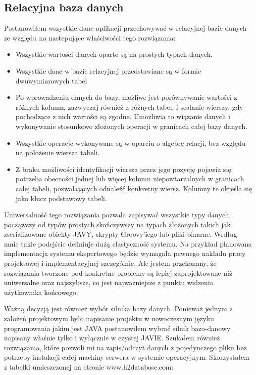 \subsection{Relacyjna baza danych}
\label{sec:relacyjnaBazaDanych}

Postanowiłem wszystkie dane aplikacji przechowywać w relacyjnej bazie danych ze względu na nastepujące właściwości tego rozwiązania:
\begin{itemize}
 \item Wszystkie wartości danych oparte są na prostych typach danych.
 \item Wszystkie dane w bazie relacyjnej przedstawiane są w formie dwuwymiarowych tabel
 \item Po wprowadzeniu danych do bazy, możliwe jest porównywanie wartości z różnych kolumn, zazwyczaj również z różnych tabel, i scalanie wierszy, gdy pochodzące z nich wartości są zgodne. Umożliwia to wiązanie danych i wykonywanie stosunkowo złożonych operacji w granicach całej bazy danych.
 \item Wszystkie operacje wykonywane są w oparciu o algebrę relacji, bez względu na położenie wiersza tabeli.
 \item Z braku możliwości identyfikacji wiersza przez jego pozycję pojawia się potrzeba obecności jednej lub więcej kolumn niepowtarzalnych w granicach całej tabeli, pozwalających odnaleźć konkretny wiersz. Kolumny te określa się jako klucz podstawowy tabeli.
\end{itemize}
Uniwersalność tego rozwiązania pozwala zapisywać wszystkie typy danych, począwszy od typów prostych skończywszy na typach złożonych takich jak zserializowane obiekty JAVY, skrypty Groovy'iego lub pliki binarne. Według mnie takie podejście definiuje dużą elastyczność systemu. Na przykład planowana implementacja systemu ekspertowego będzie wymagała pewnego nakładu pracy projektowej i implementacyjnej szczególnie. Ale jestem przekonany, że rozwiązania tworzone pod konkretne problemy są lepiej zaprojektowane niż uniwersalne oraz najszybsze, co jest najważniejsze z punktu widzenia użytkownika końcowego.

Ważną decyzją jest również wybór silnika bazy danych. Ponieważ jednym z założeń projektowym było napisanie projektu w nowoczesnym języku programowania jakim jest JAVA postanowiłem wybrać silnik bazo-danowy napisany właśnie tylko i wyłącznie w czystej JAVIE. Szukałem również rozwiązania, które pozwoli mi na zapis/odczyt danych z pojedynczego pliku bez potrzeby instalacji całej machiny serwera w systemie operacyjnym. Skorzystałem z tabelki umieszczonej na stronie www.h2database.com:

